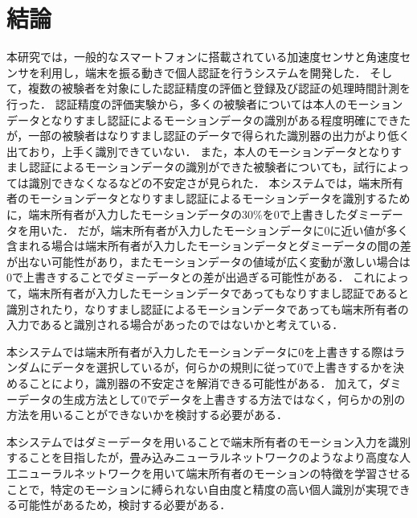 \chapter{結論}
本研究では，一般的なスマートフォンに搭載されている加速度センサと角速度センサを利用し，端末を振る動きで個人認証を行うシステムを開発した．
そして，複数の被験者を対象にした認証精度の評価と登録及び認証の処理時間計測を行った．
認証精度の評価実験から，多くの被験者については本人のモーションデータとなりすまし認証によるモーションデータの識別がある程度明確にできたが，一部の被験者はなりすまし認証のデータで得られた識別器の出力がより低く出ており，上手く識別できていない．
また，本人のモーションデータとなりすまし認証によるモーションデータの識別ができた被験者についても，試行によっては識別できなくなるなどの不安定さが見られた．
本システムでは，端末所有者のモーションデータとなりすまし認証によるモーションデータを識別するために，端末所有者が入力したモーションデータの30\%を0で上書きしたダミーデータを用いた．
だが，端末所有者が入力したモーションデータに0に近い値が多く含まれる場合は端末所有者が入力したモーションデータとダミーデータの間の差が出ない可能性があり，またモーションデータの値域が広く変動が激しい場合は0で上書きすることでダミーデータとの差が出過ぎる可能性がある．
これによって，端末所有者が入力したモーションデータであってもなりすまし認証であると識別されたり，なりすまし認証によるモーションデータであっても端末所有者の入力であると識別される場合があったのではないかと考えている．

本システムでは端末所有者が入力したモーションデータに0を上書きする際はランダムにデータを選択しているが，何らかの規則に従って0で上書きするかを決めることにより，識別器の不安定さを解消できる可能性がある．
加えて，ダミーデータの生成方法として0でデータを上書きする方法ではなく，何らかの別の方法を用いることができないかを検討する必要がある．

本システムではダミーデータを用いることで端末所有者のモーション入力を識別することを目指したが，畳み込みニューラルネットワークのようなより高度な人工ニューラルネットワークを用いて端末所有者のモーションの特徴を学習させることで，特定のモーションに縛られない自由度と精度の高い個人識別が実現できる可能性があるため，検討する必要がある．
